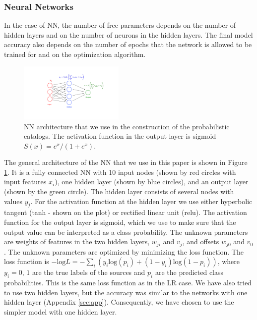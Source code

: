 \subsubsection{Neural Networks}

In the case of NN, the number of free parameters depends on the number of hidden layers and on the number of neurons in the hidden layers. The final model accuracy also depends on the number of epochs that the network is allowed to be trained for and on the optimization algorithm. 

\begin{figure}[h]
\centering
\hspace*{-0.5cm}
\includegraphics[width=0.45\textwidth]{plots/CNN_network.pdf}
\caption{
NN architecture that we use in the construction of the probabilistic catalogs.
The activation function in the output layer is sigmoid $S(x) = {e^{x}}/{(1 + e^{x})}$.
}
\label{fig:NN_structure}
\end{figure}

The general architecture of the NN that we use in this paper is shown in Figure \ref{fig:NN_structure}.
It is a fully connected NN with 10 input nodes (shown by red circles with input features $x_i$), one hidden layer (shown by blue circles),
and an output layer (shown by the green circle).
The hidden layer consists of several nodes with values $y_j$. 
For the activation function at the hidden layer we use either hyperbolic tangent (tanh - shown on the plot) or rectified linear unit (relu).
The activation function for the output layer is sigmoid, which we use to make sure that the output value can be interpreted as a class probability.
The unknown parameters are weights of features in the two hidden layers, $w_{ji}$ and $v_j$,
and offsets $w_{j0}$ and $v_0$.
The unknown parameters are optimized by minimizing the loss function. 
The loss function is
$-\text{log}L = - \sum_i (y_i\text{log}(p_i)+(1-y_i)\text{log}(1 - p_i))$, 
where $y_i = 0,\,1$ are the true labels of the sources and $p_i$ are the predicted class probabilities.
This is the same loss function as in the LR case.
We have also tried to use two hidden layers, but the accuracy was similar to the networks with one hidden layer (Appendix \ref{sec:app}). Consequently, we have chosen to use the simpler model with one hidden layer.


